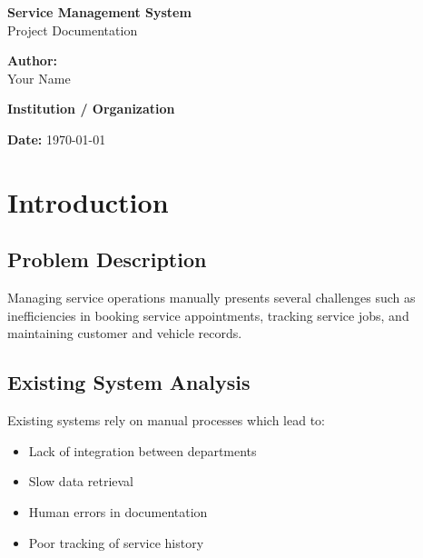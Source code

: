 \documentclass[12pt,a4paper]{report}
\begin{document}

\begin{titlepage}
\centering

\vspace*{2cm}

{\Huge \textbf{Service Management System}}\\[0.5cm]
{\Large Project Documentation}

\vspace{2cm}

\textbf{Author:} \\
[0.3cm]
Your Name

\vspace{1cm}

\textbf{Institution / Organization}

\vspace{1cm}

\textbf{Date:} \today

\vfill

\end{titlepage}


\tableofcontents
\newpage


\chapter{Introduction}

\section{Problem Description}

Managing service operations manually presents several challenges such as inefficiencies in booking service appointments, tracking service jobs, and maintaining customer and vehicle records.

\section{Existing System Analysis}

Existing systems rely on manual processes which lead to:

\begin{itemize}
\item Lack of integration between departments
\item Slow data retrieval
\item Human errors in documentation
\item Poor tracking of service history
\end{itemize}
\end{document}
